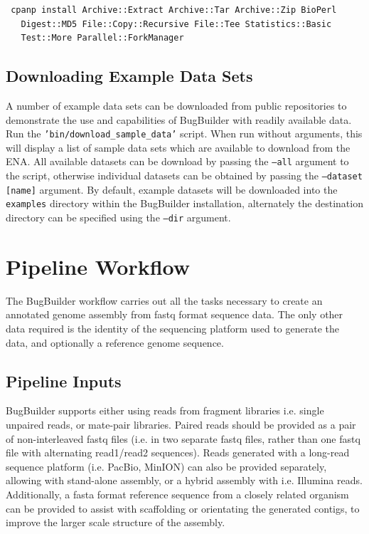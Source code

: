 \documentclass[a4paper,10pt]{article}
\begin{document}
\begin{verbatim}
 cpanp install Archive::Extract Archive::Tar Archive::Zip BioPerl
   Digest::MD5 File::Copy::Recursive File::Tee Statistics::Basic
   Test::More Parallel::ForkManager
\end{verbatim}

\subsection{Downloading Example Data Sets}
\label{sec:samples}

A number of example data sets can be downloaded from public repositories to
demonstrate the use and capabilities of BugBuilder with readily available data.
Run the {\tt 'bin/download\_sample\_data'} script. When run without arguments,
this will display a list of sample data sets which are available to download
from the ENA. All available datasets can be download by passing the {\tt --all}
argument to the script, otherwise individual datasets can be obtained by
passing the {\tt --dataset [name]} argument. By default, example datasets will
be downloaded into the {\tt examples} directory within the BugBuilder
installation, alternately the destination directory can be specified using the
{\tt --dir} argument. 


\section{Pipeline Workflow}
\label{sec:Workflow}

The BugBuilder workflow carries out all the tasks necessary to create an
annotated genome assembly from fastq format sequence data. The only other data
required is the identity of the sequencing platform used to generate the data,
and optionally a reference genome sequence.

\subsection{Pipeline Inputs}

BugBuilder supports either using reads from fragment libraries i.e. single
unpaired reads, or mate-pair libraries. Paired reads should be provided as a
pair of non-interleaved fastq files (i.e. in two separate fastq files, rather
than one fastq file with alternating read1/read2 sequences). Reads generated
with a long-read sequence platform (i.e. PacBio, MinION) can also be provided
separately, allowing with stand-alone assembly, or a hybrid assembly with i.e.
Illumina reads.  Additionally, a fasta format reference sequence from a closely
related organism can be provided to assist with scaffolding or orientating the
generated contigs, to improve the larger scale structure of the assembly.
\end{document}
